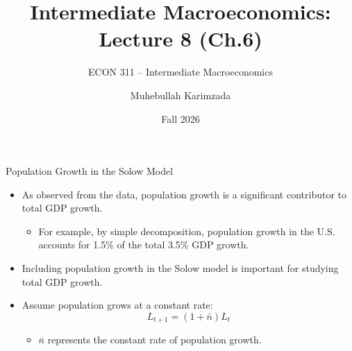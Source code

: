 \documentclass[aspectratio=1610]{beamer}
\title[Fall - Lecture 8] %
{Intermediate Macroeconomics: Lecture  8 (Ch.6)}
\subtitle{ECON 311 -- Intermediate Macroeconomics}
\author{Muhebullah Karimzada}
\institute{School of Economics \\\ University of Northern British Columbia}
\date{Fall 2026}
\begin{document}
\begin{frame}[plain]
  \titlepage
\end{frame}


\begin{frame}[wide]{Population Growth in the Solow Model}
	\begin{itemize}
		\item As observed from the data, population growth is a significant contributor to total GDP growth.
		\begin{itemize}
			\item For example, by simple decomposition, population growth in the U.S. accounts for 1.5\% of the total 3.5\% GDP growth.
		\end{itemize}
		\item Including population growth in the Solow model is important for studying total GDP growth.
		\item Assume population grows at a constant rate:
		\[
		L_{t+1} = (1 + \bar{n}) L_t
		\]
		\begin{itemize}
			\item \(\bar{n}\) represents the constant rate of population growth.
		\end{itemize}
	\end{itemize}
\end{frame}
\end{document}
